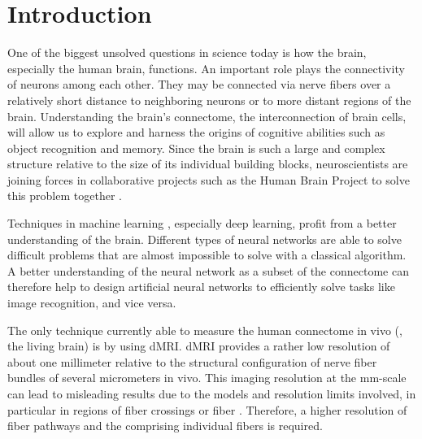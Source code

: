 \newpage\null\thispagestyle{empty}\newpage
\clearpage{\thispagestyle{empty}\cleardoublepage}
\cleardoublepage
% 
% 
% 
\setcounter{chapter}{0}
\chapter{Introduction}
\label{sec:intro}
% 
One of the biggest unsolved questions in science today is how the brain, especially the human brain, functions.
An important role plays the connectivity of neurons among each other.
They may be connected via nerve fibers over a relatively short distance to neighboring neurons or to more distant regions of the brain.
Understanding the brain's connectome, the interconnection of brain cells, will allow us to explore and harness the origins of cognitive abilities such as object recognition and memory.
Since the brain is such a large and complex structure relative to the size of its individual building blocks, neuroscientists are joining forces in collaborative projects such as the Human Brain Project to solve this problem together \cite{Markram2006, Shen2012, Amunts2013, Amunts2016}.
\par
% 
Techniques in machine learning \cite{murphy2013machine, Goodfellow-et-al-2016}, especially deep learning, profit from a better understanding of the brain. 
Different types of neural networks are able to solve difficult problems that are almost impossible to solve with a classical algorithm.
A better understanding of the neural network as a subset of the connectome can therefore help to design artificial neural networks to efficiently solve tasks like image recognition, and vice versa.
\par
% 
The only technique currently able to measure the human connectome in vivo (\ie{}, the living brain) is by using \ac{dMRI}.
\ac{dMRI} provides a rather low resolution of about one millimeter relative to the structural configuration of nerve fiber bundles of several micrometers in vivo.
This imaging resolution at the \si{\milli\meter}-scale can lead to misleading results due to the models and resolution limits involved, in particular in regions of fiber crossings or fiber  \cite{MaierHein2017, Schilling2021}.
Therefore, a higher resolution of fiber pathways and the comprising individual fibers is required.
